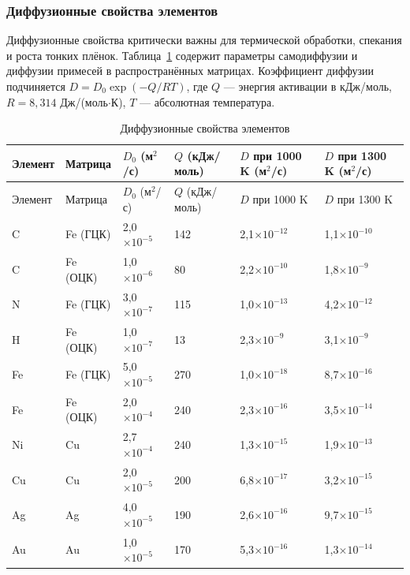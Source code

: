 \documentclass[12pt,a4paper]{article}
\begin{document}
	\subsubsection{Диффузионные свойства элементов}
	\label{subsec:diffusion-properties-func}
	
	Диффузионные свойства критически важны для термической обработки, спекания и роста тонких плёнок. Таблица~\ref{tab:diffusion-properties-func} содержит параметры самодиффузии и диффузии примесей в распространённых матрицах. Коэффициент диффузии подчиняется \(D = D_0 \exp(-Q/RT)\), где \(Q\) — энергия активации в кДж/моль, \(R = 8,314\) Дж/(моль\(\cdot\)К), \(T\) — абсолютная температура.
	
	\begin{longtable}{p{1.2cm}p{1.2cm}p{2.0cm}p{2.5cm}p{2.5cm}p{2.5cm}}
		\caption{Диффузионные свойства элементов} \label{tab:diffusion-properties-func} \\
		\toprule
		Элемент & Матрица & \(D_0\) (м\(^2\)/с) & \(Q\) (кДж/моль) & \(D\) при 1000 K (м\(^2\)/с) & \(D\) при 1300 K (м\(^2\)/с) \\
		\midrule
		\endfirsthead
		\toprule
		Элемент & Матрица & \(D_0\) (м\(^2\)/с) & \(Q\) (кДж/моль) & \(D\) при 1000 K & \(D\) при 1300 K \\
		\midrule
		\endhead
		C & Fe (ГЦК) & 2,0\(\times10^{-5}\) & 142 & 2,1\(\times10^{-12}\) & 1,1\(\times10^{-10}\) \\
		C & Fe (ОЦК) & 1,0\(\times10^{-6}\) & 80 & 2,2\(\times10^{-10}\) & 1,8\(\times10^{-9}\) \\
		N & Fe (ГЦК) & 3,0\(\times10^{-7}\) & 115 & 1,0\(\times10^{-13}\) & 4,2\(\times10^{-12}\) \\
		H & Fe (ОЦК) & 1,0\(\times10^{-7}\) & 13 & 2,3\(\times10^{-9}\) & 3,1\(\times10^{-9}\) \\
		Fe & Fe (ГЦК) & 5,0\(\times10^{-5}\) & 270 & 1,0\(\times10^{-18}\) & 8,7\(\times10^{-16}\) \\
		Fe & Fe (ОЦК) & 2,0\(\times10^{-4}\) & 240 & 2,3\(\times10^{-16}\) & 3,5\(\times10^{-14}\) \\
		Ni & Cu & 2,7\(\times10^{-4}\) & 240 & 1,3\(\times10^{-15}\) & 1,9\(\times10^{-13}\) \\
		Cu & Cu & 2,0\(\times10^{-5}\) & 200 & 6,8\(\times10^{-17}\) & 3,2\(\times10^{-15}\) \\
		Ag & Ag & 4,0\(\times10^{-5}\) & 190 & 2,6\(\times10^{-16}\) & 9,7\(\times10^{-15}\) \\
		Au & Au & 1,0\(\times10^{-5}\) & 170 & 5,3\(\times10^{-16}\) & 1,3\(\times10^{-14}\) \\

\end{longtable}
\end{document}
